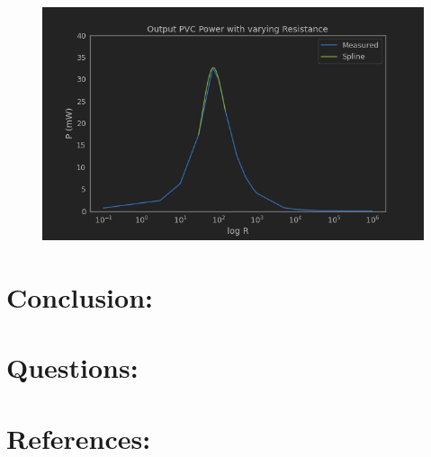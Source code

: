 \documentclass[12pt,a4paper]{article}
\begin{document}
\begin{figure}[h]
	\centering
	\includegraphics[width=6in]{l1_b_1.png}
\end{figure}

\section*{Conclusion:}
\section*{Questions:}
\section*{References:}
\end{document}
